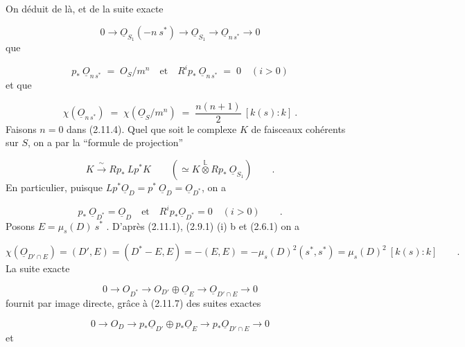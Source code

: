 
On déduit de là, et de la suite exacte

\begin{equation*}
0 \longrightarrow \underline{O}_{S_1}(-n\ s^*) \longrightarrow \underline{O}_{S_1} \longrightarrow \underline{O}_{n\,s^*} \longrightarrow 0
\end{equation*}
que

\begin{equation}\tag{2.11.5}
p_*\ \underline{O}_{n\,s^*} \;=\; O_S/m^n \quad \text{et} \quad R^i p_*\ \underline{O}_{n\,s^*} \;=\; 0 \quad (i > 0)
\end{equation}
et que

\begin{equation}\tag{2.11.6}
\chi(\underline{O}_{n\,s^*}) \;=\; \chi(\underline{O}_S/m^n) \;=\; \frac{n(n+1)}{2} \ [k(s):k] \ .
\end{equation}
Faisons $n = 0$ dans (2.11.4). Quel que soit le complexe $K$ de faisceaux cohérents sur $S$, on a par la ``formule de projection''

\begin{equation*}
K \xrightarrow{\ \sim\ } Rp_*\ Lp^*K \qquad (\simeq K \overset{\mathbb{L}}{\otimes} Rp_*\ \underline{O}_{S_1}) \qquad .
\end{equation*}
En particulier, puisque $Lp^*\underline{O}_D = p^*\ \underline{O}_D = \underline{O}_{D^*}$, on a

\begin{equation}\tag{2.11.7}
p_*\ \underline{O}_{D^*} = \underline{O}_D \quad \text{et} \quad R^i p_*\underline{O}_{D^*} = 0 \quad (i>0) \qquad .
\end{equation}
Posons $E = \mu_s(D)\ s^*$ . D'après (2.11.1), (2.9.1) (i) b et (2.6.1) on a

\begin{equation}\tag{2.11.8}
\chi(\underline{O}_{D'\cap E}) = (D',E) = (D^* - E,E) = -(E,E) = -\mu_s(D)^2(s^*,s^*) = \mu_s(D)^2\ [k(s) : k] \qquad .
\end{equation}
La suite exacte

\begin{equation*}
0 \longrightarrow O_{D^*} \longrightarrow O_{D'} \oplus \underline{O}_E \longrightarrow \underline{O}_{D'\cap E} \longrightarrow 0
\end{equation*}
fournit par image directe, grâce à (2.11.7) des suites exactes

\begin{equation*}
0 \longrightarrow O_D \longrightarrow p_*\underline{O}_{D'} \oplus p_*\underline{O}_E \longrightarrow p_*\underline{O}_{D'\cap E} \longrightarrow 0
\end{equation*}
et

